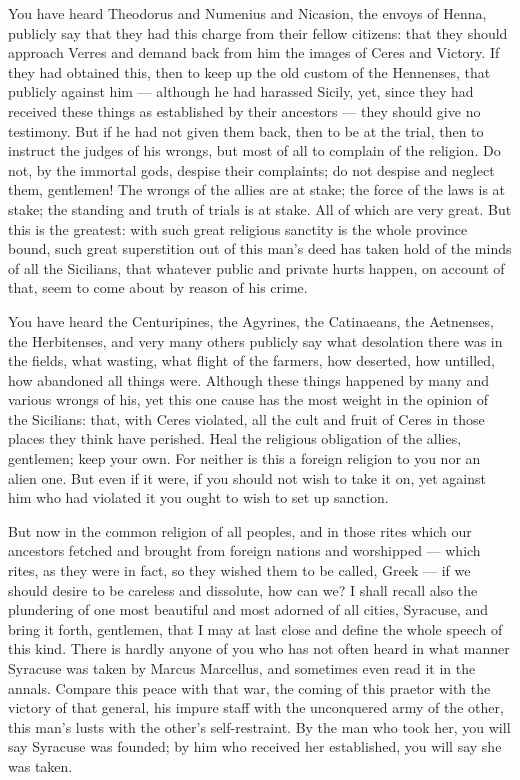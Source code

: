  You have heard Theodorus and Numenius and Nicasion, the envoys of Henna, publicly say that they had this charge from their fellow citizens: that they should approach Verres and demand back from him the images of Ceres and Victory. If they had obtained this, then to keep up the old custom of the Hennenses, that publicly against him --- although he had harassed Sicily, yet, since they had received these things as established by their ancestors --- they should give no testimony. But if he had not given them back, then to be at the trial, then to instruct the judges of his wrongs, but most of all to complain of the religion. Do not, by the immortal gods, despise their complaints; do not despise and neglect them, gentlemen! The wrongs of the allies are at stake; the force of the laws is at stake; the standing and truth of trials is at stake. All of which are very great. But this is the greatest: with such great religious sanctity is the whole province bound, such great superstition out of this man's deed has taken hold of the minds of all the Sicilians, that whatever public and private hurts happen, on account of that, seem to come about by reason of his crime.

 You have heard the Centuripines, the Agyrines, the Catinaeans, the Aetnenses, the Herbitenses, and very many others publicly say what desolation there was in the fields, what wasting, what flight of the farmers, how deserted, how untilled, how abandoned all things were. Although these things happened by many and various wrongs of his, yet this one cause has the most weight in the opinion of the Sicilians: that, with Ceres violated, all the cult and fruit of Ceres in those places they think have perished. Heal the religious obligation of the allies, gentlemen; keep your own. For neither is this a foreign religion to you nor an alien one. But even if it were, if you should not wish to take it on, yet against him who had violated it you ought to wish to set up sanction.

 But now in the common religion of all peoples, and in those rites which our ancestors fetched and brought from foreign nations and worshipped --- which rites, as they were in fact, so they wished them to be called, Greek --- if we should desire to be careless and dissolute, how can we? I shall recall also the plundering of one most beautiful and most adorned of all cities, Syracuse, and bring it forth, gentlemen, that I may at last close and define the whole speech of this kind. There is hardly anyone of you who has not often heard in what manner Syracuse was taken by Marcus Marcellus, and sometimes even read it in the annals. Compare this peace with that war, the coming of this praetor with the victory of that general, his impure staff with the unconquered army of the other, this man's lusts with the other's self-restraint. By the man who took her, you will say Syracuse was founded; by him who received her established, you will say she was taken.

